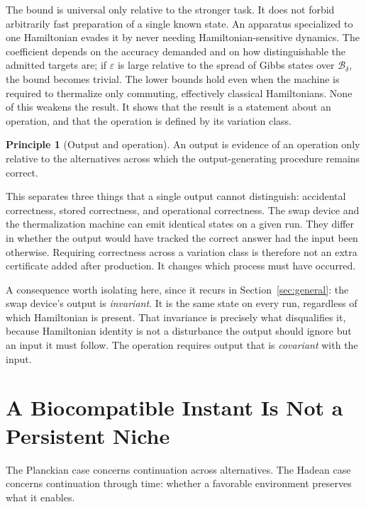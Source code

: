 \documentclass[11pt]{article}
\theoremstyle{definition}
\newtheorem{principle}{Principle}
\newcommand{\Ball}{\mathcal B}
\begin{document}
The bound is universal only relative to the stronger task. It does not forbid arbitrarily fast preparation of a single known state. An apparatus specialized to one Hamiltonian evades it by never needing Hamiltonian-sensitive dynamics. The coefficient depends on the accuracy demanded and on how distinguishable the admitted targets are; if $\varepsilon$ is large relative to the spread of Gibbs states over $\Ball_\delta$, the bound becomes trivial. The lower bounds hold even when the machine is required to thermalize only commuting, effectively classical Hamiltonians. None of this weakens the result. It shows that the result is a statement about an operation, and that the operation is defined by its variation class.

\begin{principle}[Output and operation]
An output is evidence of an operation only relative to the alternatives across which the output-generating procedure remains correct.
\end{principle}

This separates three things that a single output cannot distinguish: accidental correctness, stored correctness, and operational correctness. The swap device and the thermalization machine can emit identical states on a given run. They differ in whether the output would have tracked the correct answer had the input been otherwise. Requiring correctness across a variation class is therefore not an extra certificate added after production. It changes which process must have occurred.

A consequence worth isolating here, since it recurs in Section~\ref{sec:general}: the swap device's output is \emph{invariant}. It is the same state on every run, regardless of which Hamiltonian is present. That invariance is precisely what disqualifies it, because Hamiltonian identity is not a disturbance the output should ignore but an input it must follow. The operation requires output that is \emph{covariant} with the input.

\section{A Biocompatible Instant Is Not a Persistent Niche}\label{sec:instant}

The Planckian case concerns continuation across alternatives. The Hadean case concerns continuation through time: whether a favorable environment preserves what it enables.
\end{document}
